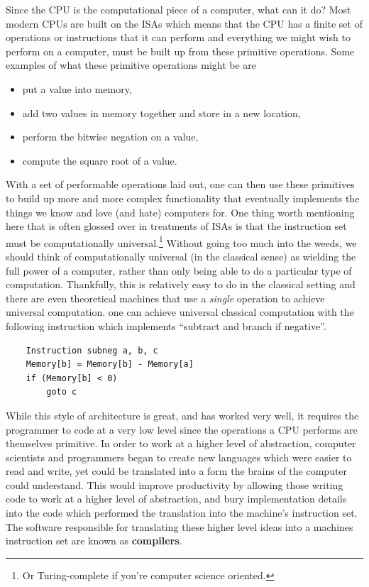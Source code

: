 Since the \ac{CPU} is the computational piece of a computer, what can it do?
Most modern \acp{CPU} are built on the \acp{ISA} which means that the \ac{CPU} has a finite set of operations or instructions that it can perform and everything we might wish to perform on a computer, must be built up from these primitive operations.
Some examples of what these primitive operations might be are
\begin{itemize}
    \item put a value into memory,
    \item add two values in memory together and store in a new location,
    \item perform the bitwise negation on a value,
    \item compute the square root of a value.
\end{itemize}
With a set of performable operations laid out, one can then use these primitives to build up more and more complex functionality that eventually implements the things we know and love (and hate) computers for.
One thing worth mentioning here that is often glossed over in treatments of \acp{ISA} is that the instruction set must be computationally universal.\footnote{Or Turing-complete if you're computer science oriented.}
Without going too much into the weeds, we should think of computationally universal (in the classical sense) as wielding the full power of a computer, rather than only being able to do a particular type of computation.
Thankfully, this is relatively easy to do in the classical setting and there are even theoretical machines that use a \emph{single} operation to achieve universal computation.
\Eg{} one can achieve universal classical computation with the following instruction which implements ``subtract and branch if negative''.
\begin{lstlisting}
    Instruction subneg a, b, c
    Memory[b] = Memory[b] - Memory[a]
    if (Memory[b] < 0)
        goto c
\end{lstlisting}

While this style of architecture is great, and has worked very well, it requires the programmer to code at a very low level since the operations a \ac{CPU} performs are themselves primitive.
In order to work at a higher level of abstraction, computer scientists and programmers began to create new languages which were easier to read and write, yet could be translated into a form the brains of the computer could understand.
This would improve productivity by allowing those writing code to work at a higher level of abstraction, and bury implementation details into the code which performed the translation into the machine's instruction set.
The software responsible for translating these higher level ideas into a machines instruction set are known as \textbf{compilers}.


